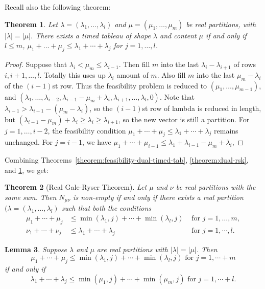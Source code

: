 \documentclass[12pt]{amsart}
\newtheorem{theorem}{Theorem}
\newtheorem{lemma}[theorem]{Lemma}
\theoremstyle{definition}
\begin{document}
Recall also the following theorem:
\begin{theorem}
  \label{theorem:feasibility-timed-tab}
  Let $\lambda=(\lambda_1,\dotsc,\lambda_l)$ and $\mu=(\mu_1,\dotsc,\mu_m)$ be real partitions, with $|\lambda|=|\mu|$.
  There exists a timed tableau of shape $\lambda$ and content $\mu$ if and only if $l\leq m$, $\mu_1+\dotsc+\mu_j\leq \lambda_1+\dotsb + \lambda_j$ for $j=1,\dotsc,l$.
\end{theorem}
\begin{proof}
  Suppose that $\lambda_i<\mu_m\leq \lambda_{i-1}$.
  Then fill $m$ into the last $\lambda_i-\lambda_{i+1}$ of rows $i, i+1,\dotsc, l$.
  Totally this uses up $\lambda_i$ amount of $m$.
  Also fill $m$ into the last $\mu_m-\lambda_i$ of the $(i-1)$st row.
  Thus the feasibility problem is reduced to $(\mu_1,\dotsc,\mu_{m-1})$, and $(\lambda_1,\dotsc,\lambda_{i-2}, \lambda_{i-1}-\mu_m +\lambda_i, \lambda_{i+1},\dotsc,\lambda_l,0)$.
  Note that $\lambda_{i-1} > \lambda_{i-1} - (\mu_m - \lambda_i)$, so the $(i-1)$st row of lambda is reduced in length,
  but $(\lambda_{i-1}-\mu_m)+\lambda_i\geq \lambda_i\geq \lambda_{i+1}$, so the new vector is still a partition.
  For $j=1,\dotsc,i-2$, the feasibility condition $\mu_1+\dotsb + \mu_j \leq \lambda_1+\dotsb +\lambda_j$ remains unchanged.
  For $j=i-1$, we have $\mu_1+\dotsb+\mu_{i-1} \leq \lambda_1+\lambda_{i-1}-\mu_m+\lambda_i$,
\end{proof}
Combining Theorems~\ref{theorem:feasibility-dual-timed-tab}, \ref{theorem:dual-rsk}, and \ref{theorem:feasibility-timed-tab}, we get:
\begin{theorem}
  [Real Gale-Ryser Theorem]
  Let $\mu$ and $\nu$ be real partitions with the same sum.
  Then $N_{\mu\nu}$ is non-empty if and only if there exists a real partition $(\lambda=(\lambda_1,\dotsc,\lambda_l)$ such that both the conditions
  \begin{align*}
    \mu_1+\dotsb + \mu_j & \leq \min(\lambda_1,j)+\dotsb + \min(\lambda_l,j) & \text{ for } j = 1,\dotsc,m,\\
    \nu_1+\dotsb + \nu_j & \leq \lambda_1+\dotsb+\lambda_j & \text{ for } j=1,\dotsb,l.
  \end{align*}
\end{theorem}
\begin{lemma}
  Suppose $\lambda$ and $\mu$ are real partitions with $|\lambda|=|\mu|$.
  Then
  \begin{displaymath}
    \mu_1+\dotsb + \mu_j \leq \min(\lambda_1,j)+\dotsb+\min(\lambda_l,j) \text{ for } j=1,\dotsb+m
  \end{displaymath}
  if and only if
  \begin{displaymath}
    \lambda_1+\dotsb + \lambda_j \leq \min(\mu_1,j)+\dotsb + \min(\mu_m,j) \text{ for } j=1,\dotsb+l.
  \end{displaymath}
\end{lemma}
\end{document}

